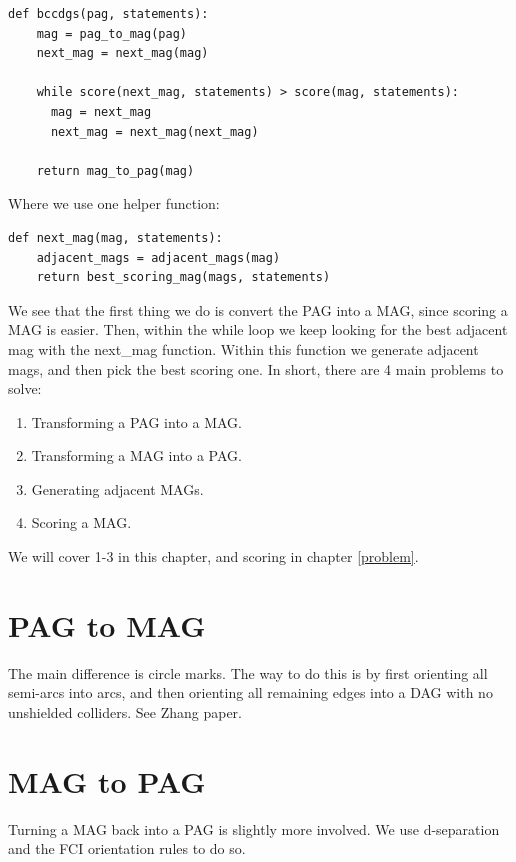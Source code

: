 \documentclass[11pt,a4paper]{report}
\begin{document}
\begin{lstlisting}
def bccdgs(pag, statements):
    mag = pag_to_mag(pag)
    next_mag = next_mag(mag)

    while score(next_mag, statements) > score(mag, statements):
      mag = next_mag
      next_mag = next_mag(next_mag)

    return mag_to_pag(mag)
\end{lstlisting}
Where we use one helper function:
\begin{lstlisting}
def next_mag(mag, statements):
    adjacent_mags = adjacent_mags(mag)
    return best_scoring_mag(mags, statements)
\end{lstlisting}
We see that the first thing we do is convert the PAG into a MAG, since
scoring a MAG is easier. Then, within the while loop we keep looking for
the best adjacent mag with the next\_mag function. Within this function we
generate adjacent mags, and then pick the best scoring one. In short,
there are 4 main problems to solve:
\begin{enumerate}
  \item Transforming a PAG into a MAG.

  \item Transforming a MAG into a PAG.

  \item Generating adjacent MAGs.

  \item Scoring a MAG.
\end{enumerate}
We will cover 1-3 in this chapter, and scoring in chapter \ref{problem}.

\section{PAG to MAG}
The main difference is circle marks. The way to do this is by first
orienting all semi-arcs into arcs, and then orienting all remaining edges
into a DAG with no unshielded colliders. See Zhang paper.

\section{MAG to PAG}
Turning a MAG back into a PAG is slightly more involved. We use
d-separation and the FCI orientation rules to do so.
\end{document}
